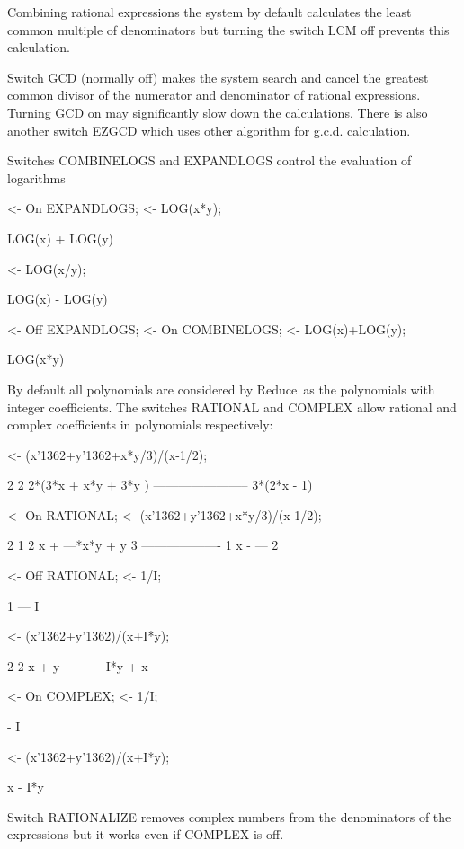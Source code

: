 \documentclass[twoside,openright]{report}
\newcommand{\grgtt}{\ttfamily}
\renewcommand{\tt}{\grgtt}
\def\^{{\tt \char'136}}                     %
\newcommand{\reduce}{{\sc Reduce}}
\begin{document}
Combining rational expressions the system by default
calculates the least common multiple of denominators but
turning the switch {\tt LCM} off prevents this calculation.

Switch {\tt GCD} (normally off) makes the system
search and cancel the greatest common divisor of the
numerator and denominator of rational expressions.
Turning {\tt GCD} on may significantly slow down the
calculations. There is also another switch {\tt EZGCD}
which uses other algorithm for g.c.d. calculation.


Switches {\tt COMBINELOGS} and {\tt EXPANDLOGS} control
the evaluation of logarithms
\begin{slisting}
<- On EXPANDLOGS;
<- LOG(x*y);

LOG(x) + LOG(y)

<- LOG(x/y);

LOG(x) - LOG(y)

<- Off EXPANDLOGS;
<- On COMBINELOGS;
<- LOG(x)+LOG(y);

LOG(x*y)
\end{slisting}

By default all polynomials are considered by \reduce\ as
the polynomials with integer coefficients. The switches
{\tt RATIONAL} and {\tt COMPLEX} allow rational and
complex coefficients in polynomials respectively:
\begin{slisting}
<- (x\^2+y\^2+x*y/3)/(x-1/2);

       2            2
 2*(3*x  + x*y + 3*y )
-----------------------
      3*(2*x - 1)

<- On RATIONAL;
<- (x\^2+y\^2+x*y/3)/(x-1/2);

  2    1         2
 x  + ---*x*y + y
       3
-------------------
           1
      x - ---
           2

<- Off RATIONAL;
<- 1/I;

 1
---
 I

<- (x\^2+y\^2)/(x+I*y);

  2    2
 x  + y
---------
 I*y + x

<- On COMPLEX;
<- 1/I;

 - I

<- (x\^2+y\^2)/(x+I*y);

x - I*y
\end{slisting}
Switch {\tt RATIONALIZE} removes complex numbers from the
denominators of the expressions but it works even if
{\tt COMPLEX} is off.
\end{document}
